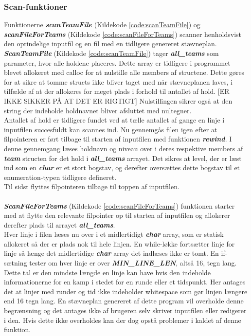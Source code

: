 \subsubsection{Scan-funktioner}
Funktionerne \textbf{\textit{scanTeamFile}} (Kildekode \ref{code:scanTeamFile}) og \textbf{\textit{scanFileForTeams}} (Kildekode \ref{code:scanFileForTeams}) scanner henholdsvist den oprindelige inputfil og en fil med en tidligere genereret stævneplan. \textbf{\textit{ScanTeamFile}} (Kildekode \ref{code:scanTeamFile}) tager \textbf{\textit{all\_teams}} som parameter, hvor alle holdene placeres. Dette array er tidligere i programmet blevet allokeret med calloc for at nulstille alle members af structene. Dette gøres for at sikre at tomme structs ikke bliver taget med når stævneplanen laves, i tilfælde af at der allokeres for meget plads i forhold til antallet af hold. [ER IKKE SIKKER PÅ AT DET ER RIGTIGT] Nulstillingen sikrer også at den string der indeholde holdnavnet bliver afsluttet med nultegner. \\
Antallet af hold er tidligere fundet ved at tælle antallet af gange en linje i inputfilen succesfuldt kan scannes ind. Nu gennemgås filen igen efter at filpointeren er ført tilbage til starten af inputfilen med funktionen \textbf{\textit{rewind}}. I denne gennemgang læses holdnavn og niveau over i deres respektive members af \textbf{\textit{team}} structen for det hold i \textbf{\textit{all\_teams}} arrayet. Det sikres at level, der er læst ind som en \textbf{\textit{char}} er et stort bogstav, og derefter oversættes dette bogstav til et enumeration-typen tidligere defineret. \\
Til sidst flyttes filpointeren tilbage til toppen af inputfilen.\\\\
\textbf{\textit{ScanFileForTeams}} (Kildekode \ref{code:scanFileForTeams}) funktionen starter med at flytte den relevante filpointer op til starten af inputfilen og allokerer derefter plads til arrayet \textbf{\textit{all\_teams}}. \\
Hver linje i filen læses nu over i et midlertidigt \textbf{\textit{char}} array, som er statisk allokeret så der er plads nok til hele linjen. En while-løkke fortsætter linje for linje så længe det midlertidige \textbf{\textit{char}} array det indlæses ikke er tomt. En if-sætning tester om hver linje er over \textbf{\textit{MIN\_LINE\_LEN}}, altså 16, tegn lang. Dette tal er den mindste længde en linje kan have hvis den indeholde informationerne for en kamp i stedet for en runde eller et tidspunkt. Her antages det at linjer med runder og tid ikke indeholder whitespace som gør linjen længere end 16 tegn lang. En stævneplan genereret af dette program vil overholde denne begrænsning og det antages ikke af brugeren selv skriver inputfilen eller redigerer i den. Hvis dette ikke overholdes kan der dog opstå problemer i kaldet af denne funktion. \\
